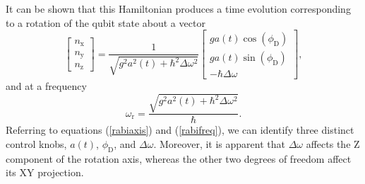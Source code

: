 \documentclass[journal]{IEEEtran}
\begin{document}
It can be shown that this Hamiltonian produces a time evolution corresponding to a rotation of the qubit state about a vector%
\begin{equation}
\left[\begin{array}{c}n_\text{x}\\n_\text{y}\\n_\text{z}\end{array}\right]=\frac{1}{\sqrt{g^2a^2\left(t\right)+\hbar^2\Delta\omega^2}}\left[\begin{array}{c}ga\left(t\right)\cos\left(\phi_\text{D}\right)\\ga\left(t\right)\sin\left(\phi_\text{D}\right)\\-\hbar\Delta\omega\end{array}\right],\label{rabiaxis}
\end{equation}
and at a frequency %
\begin{equation}
\omega_\text{r}=\frac{\sqrt{g^2a^2(t)+\hbar^2\Delta\omega^2}}{\hbar}.\label{rabifreq}
\end{equation}
Referring to equations (\ref{rabiaxis}) and (\ref{rabifreq}), we can identify three distinct control knobs, $a\left(t\right)$, $\phi_\text{D}$, and $\Delta\omega$. Moreover, it is apparent that $\Delta\omega$ affects the Z component of the rotation axis, whereas the other two degrees of freedom affect its XY projection.
\end{document}
